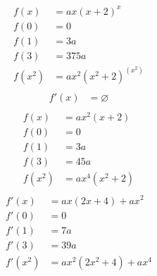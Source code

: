 \begin{align*}
f(x) &= ax{{\left(x+2\right)}^{x}}\\
f(0) &= 0\\ 
f(1) &= 3a\\ 
f(3) &= 375a\\ 
f(x^2) &= a{{x}^{2}}{{\left({{x}^{2}}+2\right)}^{\left({{x}^{2}}\right)}}\\
\end{align*}
\begin{align*}
f'(x) &= \varnothing\\
\end{align*}
\begin{align*}
f(x) &= a{{x}^{2}}(x+2)\\
f(0) &= 0\\ 
f(1) &= 3a\\ 
f(3) &= 45a\\ 
f(x^2) &= a{{x}^{4}}({{x}^{2}}+2)\\
\end{align*}
\begin{align*}
f'(x) &= ax(2x+4)+a{{x}^{2}}\\
f'(0) &= 0\\ 
f'(1) &= 7a\\
f'(3) &= 39a\\ 
f'(x^2) &= a{{x}^{2}}(2{{x}^{2}}+4)+a{{x}^{4}}\\
\end{align*}
